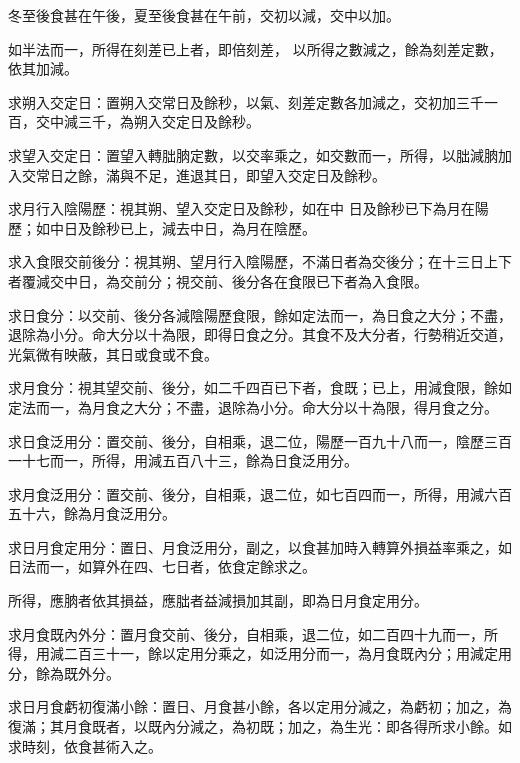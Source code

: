 \begin{pinyinscope}
 冬至後食甚在午後，夏至後食甚在午前，交初以減，交中以加。



 如半法而一，所得在刻差已上者，即倍刻差，
 以所得之數減之，餘為刻差定數，依其加減。



 求朔入交定日：置朔入交常日及餘秒，以氣、刻差定數各加減之，交初加三千一百，交中減三千，為朔入交定日及餘秒。



 求望入交定日：置望入轉朏朒定數，以交率乘之，如交數而一，所得，以朏減朒加入交常日之餘，滿與不足，進退其日，即望入交定日及餘秒。



 求月行入陰陽歷：視其朔、望入交定日及餘秒，如在中
 日及餘秒已下為月在陽歷；如中日及餘秒已上，減去中日，為月在陰歷。



 求入食限交前後分：視其朔、望月行入陰陽歷，不滿日者為交後分；在十三日上下者覆減交中日，為交前分；視交前、後分各在食限已下者為入食限。



 求日食分：以交前、後分各減陰陽歷食限，餘如定法而一，為日食之大分；不盡，退除為小分。命大分以十為限，即得日食之分。其食不及大分者，行勢稍近交道，光氣微有映蔽，其日或食或不食。



 求月食分：視其望交前、後分，如二千四百已下者，食既；已上，用減食限，餘如定法而一，為月食之大分；不盡，退除為小分。命大分以十為限，得月食之分。



 求日食泛用分：置交前、後分，自相乘，退二位，陽歷一百九十八而一，陰歷三百一十七而一，所得，用減五百八十三，餘為日食泛用分。



 求月食泛用分：置交前、後分，自相乘，退二位，如七百四而一，所得，用減六百五十六，餘為月食泛用分。



 求日月食定用分：置日、月食泛用分，副之，以食甚加時入轉算外損益率乘之，如日法而一，如算外在四、七日者，依食定餘求之。



 所得，應朒者依其損益，應朏者益減損加其副，即為日月食定用分。



 求月食既內外分：置月食交前、後分，自相乘，退二位，如二百四十九而一，所得，用減二百三十一，餘以定用分乘之，如泛用分而一，為月食既內分；用減定用分，餘為既外分。



 求日月食虧初復滿小餘：置日、月食甚小餘，各以定用分減之，為虧初；加之，為復滿；其月食既者，以既內分減之，為初既；加之，為生光：即各得所求小餘。如求時刻，依食甚術入之。




\end{pinyinscope}
